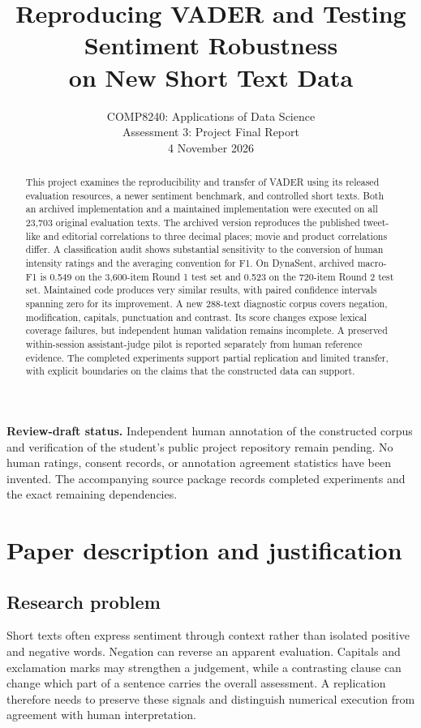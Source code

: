 \documentclass[11pt]{article}
\title{Reproducing VADER and Testing Sentiment Robustness\\on New Short Text Data}
\author{COMP8240: Applications of Data Science\\Assessment 3: Project Final Report\\4 November 2026}
\date{}
\begin{document}
\maketitle
\begin{abstract}
This project examines the reproducibility and transfer of VADER using its released
evaluation resources, a newer sentiment benchmark, and controlled short texts.
Both an archived implementation and a maintained implementation were executed on
all 23,703 original evaluation texts. The archived version reproduces the published
tweet-like and editorial correlations to three decimal places; movie and product
correlations differ. A classification audit shows substantial sensitivity to the
conversion of human intensity ratings and the averaging convention for F1.
On DynaSent, archived macro-F1 is 0.549 on the 3,600-item Round 1 test set and
0.523 on the 720-item Round 2 test set. Maintained code produces very similar
results, with paired confidence intervals spanning zero for its improvement.
A new 288-text diagnostic corpus covers negation, modification, capitals,
punctuation and contrast. Its score changes expose lexical coverage failures,
but independent human validation remains incomplete. A preserved within-session
assistant-judge pilot is reported separately from human reference evidence.
The completed experiments support partial replication and limited transfer,
with explicit boundaries on the claims that the constructed data can support.
\end{abstract}

\noindent\textbf{Review-draft status.} Independent human annotation of the
constructed corpus and verification of the student's public project repository
remain pending. No human ratings, consent records, or annotation agreement
statistics have been invented. The accompanying source package records completed
experiments and the exact remaining dependencies.

\section{Paper description and justification}

\subsection{Research problem}
Short texts often express sentiment through context rather than isolated positive
and negative words. Negation can reverse an apparent evaluation. Capitals and
exclamation marks may strengthen a judgement, while a contrasting clause can
change which part of a sentence carries the overall assessment. A replication
therefore needs to preserve these signals and distinguish numerical execution
from agreement with human interpretation.
\end{document}
